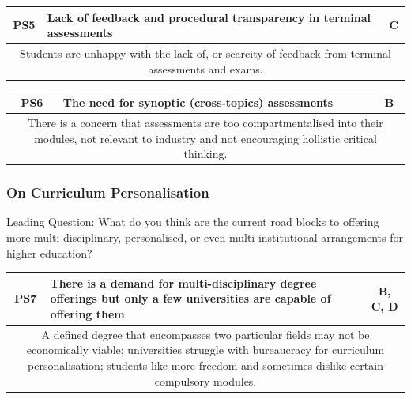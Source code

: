 \begin{table}[!ht]
	\begin{tabularx}{\textwidth}{|c|X|c|}
		\hline
		PS5 & \textbf{Lack of feedback and procedural transparency in terminal assessments} & C \\
		\hline
		\multicolumn{3}{|X|}{Students are unhappy with the lack of, or scarcity of feedback
			from terminal assessments and exams.}                                                   \\
		\hline
	\end{tabularx}
\end{table}

\begin{table}[!ht]
	\begin{tabularx}{\textwidth}{|c|X|c|}
		\hline
		PS6 & \textbf{The need for synoptic (cross-topics) assessments} & B \\
		\hline
		\multicolumn{3}{|X|}{There is a concern that assessments are too
			compartmentalised into their modules, not relevant to industry and not encouraging
			hollistic critical thinking.}                                       \\
		\hline
	\end{tabularx}
\end{table}

\subsubsection{On Curriculum Personalisation}

Leading Question: What do you think are the current road blocks to offering more multi-disciplinary,
personalised, or even multi-institutional arrangements for higher education?

\begin{table}[!ht]
	\begin{tabularx}{\textwidth}{|c|X|c|}
		\hline
		PS7                                        & \textbf{There is a demand for multi-disciplinary degree offerings but only a few
		universities are capable of offering them} & B, C, D                                                                          \\
		\hline
		\multicolumn{3}{|X|}{A defined degree that encompasses two particular fields may not be economically viable;
			universities struggle with bureaucracy for curriculum personalisation;
			students like more freedom and sometimes dislike certain compulsory modules.}                                                 \\
		\hline
	\end{tabularx}
\end{table}

